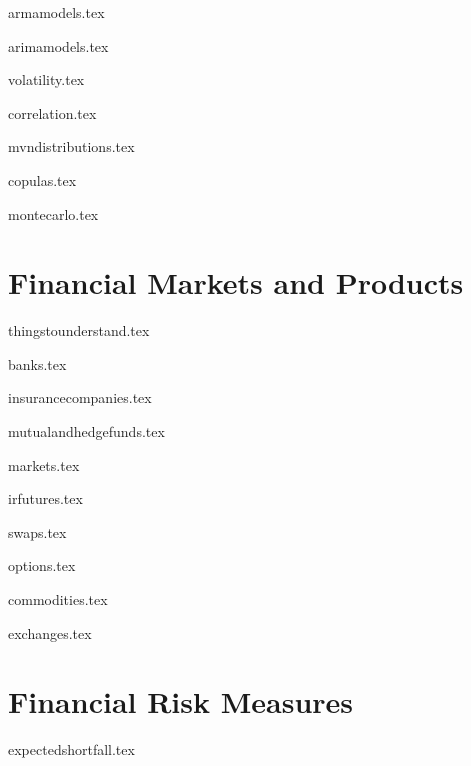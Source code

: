\documentclass{report}
\begin{document}
{armamodels.tex}
\pagebreak

{arimamodels.tex}

{volatility.tex}
\pagebreak

{correlation.tex}
\pagebreak

{mvndistributions.tex}
\pagebreak

{copulas.tex}
\pagebreak

{montecarlo.tex}
\pagebreak

\part{Financial Markets and Products}

{thingstounderstand.tex}
\pagebreak

{banks.tex}
\pagebreak

{insurancecompanies.tex}
\pagebreak

{mutualandhedgefunds.tex}
\pagebreak

{markets.tex}
\pagebreak

{irfutures.tex}
\pagebreak

{swaps.tex}
\pagebreak

{options.tex}
\pagebreak

{commodities.tex}
\pagebreak

{exchanges.tex}
\pagebreak

\part{Financial Risk Measures}

{expectedshortfall.tex}
\pagebreak
\end{document}
